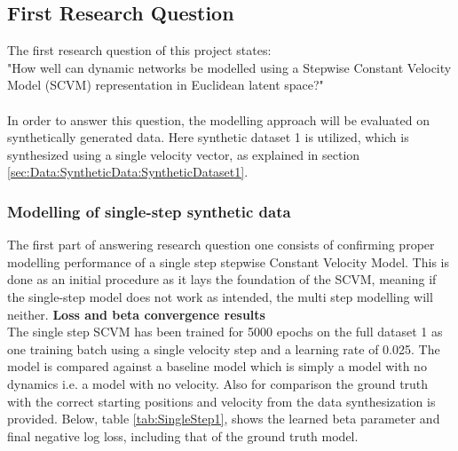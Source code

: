\subsection{First Research Question}
\label{sec:ResearchQuestion1}
The first research question of this project states:
\\
"How well can dynamic networks be modelled using a Stepwise Constant Velocity Model (SCVM) representation in Euclidean latent space?"
\\\\
In order to answer this question, the modelling approach will be evaluated on synthetically generated data.
Here synthetic dataset 1 is utilized, which is synthesized using a single velocity vector, as explained in section \ref{sec:Data:SyntheticData:SyntheticDataset1}.

\subsubsection{Modelling of single-step synthetic data}
\label{sec:ResearchQuestion1:singleStepSynthetic}
The first part of answering research question one consists of confirming proper modelling performance of a single step stepwise Constant Velocity Model.
This is done as an initial procedure as it lays the foundation of the SCVM, meaning if the single-step model does not work as intended, the multi step modelling will neither.
\clearpage
\noindent
\textbf{Loss and beta convergence results}
\\
The single step SCVM has been trained for 5000 epochs on the full dataset 1 as one training batch using a single velocity step and a learning rate of 0.025. The model is compared against a baseline model which is simply a model with no dynamics i.e. a model with no velocity. Also for comparison the ground truth with the correct starting positions and velocity from the data synthesization is provided.
Below, table \ref{tab:SingleStep1}, shows the learned beta parameter and final negative log loss, including that of the ground truth model.

